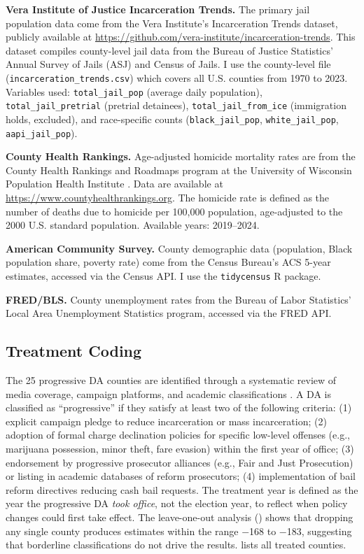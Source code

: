\documentclass[12pt]{article}
\begin{document}
\textbf{Vera Institute of Justice Incarceration Trends.} The primary jail population data come from the Vera Institute's Incarceration Trends dataset, publicly available at \url{https://github.com/vera-institute/incarceration-trends}. This dataset compiles county-level jail data from the Bureau of Justice Statistics' Annual Survey of Jails (ASJ) and Census of Jails. I use the county-level file (\texttt{incarceration\_trends.csv}) which covers all U.S. counties from 1970 to 2023. Variables used: \texttt{total\_jail\_pop} (average daily population), \texttt{total\_jail\_pretrial} (pretrial detainees), \texttt{total\_jail\_from\_ice} (immigration holds, excluded), and race-specific counts (\texttt{black\_jail\_pop}, \texttt{white\_jail\_pop}, \texttt{aapi\_jail\_pop}).

\textbf{County Health Rankings.} Age-adjusted homicide mortality rates are from the County Health Rankings and Roadmaps program at the University of Wisconsin Population Health Institute \citep{chr2024}. Data are available at \url{https://www.countyhealthrankings.org}. The homicide rate is defined as the number of deaths due to homicide per 100,000 population, age-adjusted to the 2000 U.S. standard population. Available years: 2019--2024.

\textbf{American Community Survey.} County demographic data (population, Black population share, poverty rate) come from the Census Bureau's ACS 5-year estimates, accessed via the Census API. I use the \texttt{tidycensus} R package.

\textbf{FRED/BLS.} County unemployment rates from the Bureau of Labor Statistics' Local Area Unemployment Statistics program, accessed via the FRED API.

\subsection{Treatment Coding}

The 25 progressive DA counties are identified through a systematic review of media coverage, campaign platforms, and academic classifications \citep{baumer2022da, petersen2024progressive}. A DA is classified as ``progressive'' if they satisfy at least two of the following criteria: (1) explicit campaign pledge to reduce incarceration or mass incarceration; (2) adoption of formal charge declination policies for specific low-level offenses (e.g., marijuana possession, minor theft, fare evasion) within the first year of office; (3) endorsement by progressive prosecutor alliances (e.g., Fair and Just Prosecution) or listing in academic databases of reform prosecutors; (4) implementation of bail reform directives reducing cash bail requests. The treatment year is defined as the year the progressive DA \textit{took office}, not the election year, to reflect when policy changes could first take effect. The leave-one-out analysis () shows that dropping any single county produces estimates within the range $-$168 to $-$183, suggesting that borderline classifications do not drive the results.  lists all treated counties.
\end{document}
